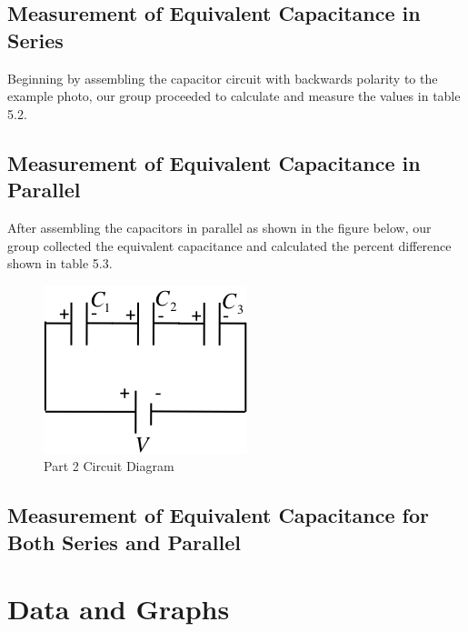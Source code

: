 \documentclass[titlepage]{article}
\begin{document}
        \subsection{Measurement of Equivalent Capacitance in Series}
        Beginning by assembling the capacitor circuit with backwards polarity to the example photo, our group proceeded to calculate and measure the values in table 5.2.\\ 


        \subsection{Measurement of Equivalent Capacitance in Parallel}
        After assembling the capacitors in parallel as shown in the figure below, our group collected the equivalent capacitance and calculated the percent difference shown in table 5.3.
        \begin{figure}[hbt!] 
            \centering
            \caption*{Part 2 Circuit Diagram}
            \includegraphics{images/procedure/part2.png}
        \end{figure} 




        \subsection{Measurement of Equivalent Capacitance for Both Series and Parallel}



	\section{Data and Graphs}
\end{document}
